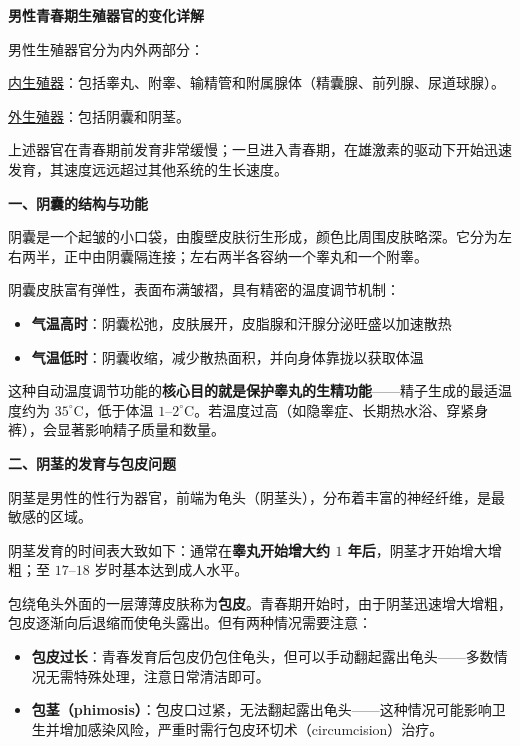 \documentclass[12pt,a4paper,twoside]{ctexbook}
\begin{document}
\vspace{0.8em}
\noindent\textbf{男性青春期生殖器官的变化详解}

男性生殖器官分为内外两部分：

\underline{内生殖器}：包括睾丸、附睾、输精管和附属腺体（精囊腺、前列腺、尿道球腺）。

\underline{外生殖器}：包括阴囊和阴茎。

上述器官在青春期前发育非常缓慢；一旦进入青春期，在雄激素的驱动下开始迅速发育，其速度远远超过其他系统的生长速度。

\vspace{0.3em}
\noindent\textbf{一、阴囊的结构与功能}

阴囊是一个起皱的小口袋，由腹壁皮肤衍生形成，颜色比周围皮肤略深。它分为左右两半，正中由阴囊隔连接；左右两半各容纳一个睾丸和一个附睾。

阴囊皮肤富有弹性，表面布满皱褶，具有精密的温度调节机制：
\begin{itemize}
	\item \textbf{气温高时}：阴囊松弛，皮肤展开，皮脂腺和汗腺分泌旺盛以加速散热
	\item \textbf{气温低时}：阴囊收缩，减少散热面积，并向身体靠拢以获取体温
\end{itemize}

这种自动温度调节功能的\textbf{核心目的就是保护睾丸的生精功能}——精子生成的最适温度约为 $35^\circ\text{C}$，低于体温 $1$--$2^\circ\text{C}$。若温度过高（如隐睾症、长期热水浴、穿紧身裤），会显著影响精子质量和数量。

\vspace{0.3em}
\noindent\textbf{二、阴茎的发育与包皮问题}

阴茎是男性的性行为器官，前端为龟头（阴茎头），分布着丰富的神经纤维，是最敏感的区域。

阴茎发育的时间表大致如下：通常在\textbf{睾丸开始增大约 $1$ 年后}，阴茎才开始增大增粗；至 $17$--$18$ 岁时基本达到成人水平。

包绕龟头外面的一层薄薄皮肤称为\textbf{包皮}。青春期开始时，由于阴茎迅速增大增粗，包皮逐渐向后退缩而使龟头露出。但有两种情况需要注意：
\begin{itemize}
	\item \textbf{包皮过长}：青春发育后包皮仍包住龟头，但可以手动翻起露出龟头——多数情况无需特殊处理，注意日常清洁即可。
	\item \textbf{包茎（phimosis）}：包皮口过紧，无法翻起露出龟头——这种情况可能影响卫生并增加感染风险，严重时需行包皮环切术（circumcision）治疗。
\end{itemize}
\end{document}

